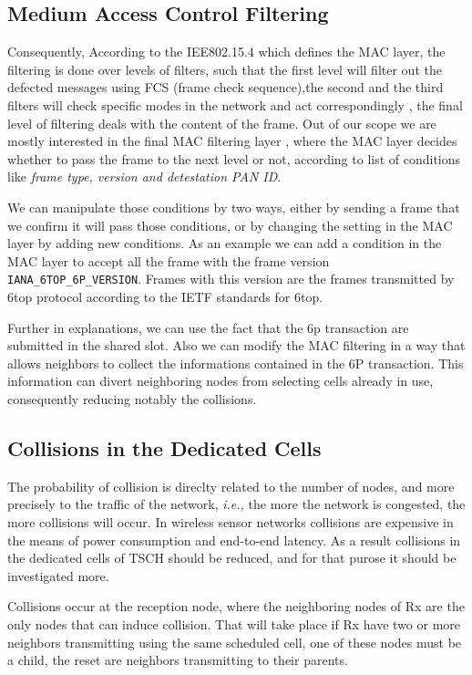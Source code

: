 \documentclass[10pt, conference, compsocconf]{IEEEtran}
\begin{document}
\subsection{Medium Access Control Filtering}

Consequently, According to the IEE802.15.4 which defines the MAC layer, the filtering is done over levels of filters, such that the first level  will filter out the defected messages using FCS (frame check sequence),the second and the third filters will check specific modes in the network and act correspondingly , the final level of  filtering deals with the content of the frame. Out of our scope we are mostly interested in the final MAC filtering layer , where the MAC layer decides whether to pass the frame to the next level or not, according to list of conditions like {\em frame type, version and detestation PAN ID}.

We can manipulate those conditions by two ways, either by sending a frame that we confirm it will pass those conditions, or by changing the setting in the MAC layer  by adding new conditions. As an example we can add a condition in the MAC layer to accept all the frame with the frame version \verb|IANA_6TOP_6P_VERSION|. Frames with this version are the frames transmitted by 6top protocol according to the IETF standards for 6top.

Further in explanations, we can use the fact that the 6p transaction are submitted in the shared slot. Also we can modify the MAC filtering in a way that allows neighbors to collect the informations contained in the 6P transaction. This information can divert neighboring nodes from selecting cells already in use, consequently reducing notably the collisions.

\subsection{Collisions in the Dedicated Cells }

The probability of collision is direclty related to the number of nodes, and more precisely to the traffic of the network, {\em i.e.,} the more the network is congested, the more collisions will occur. In wireless sensor networks collisions are expensive in the means of power consumption and  end-to-end latency. As a result collisions in the dedicated cells of TSCH should be reduced, and for that purose it should be investigated more. 


 Collisions occur at the reception node, where the neighboring nodes of Rx are the only nodes that can induce collision. That will take place if Rx have two or more neighbors transmitting using the same scheduled cell, one of these nodes must be a child, the reset are neighbors transmitting to their parents. 
   
\end{document}
